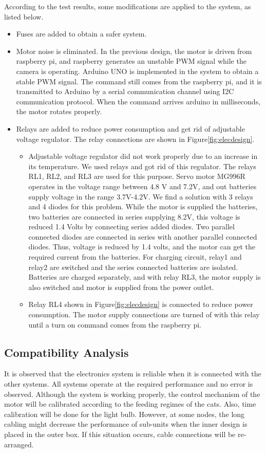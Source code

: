 According to the test results, some modifications are applied to the system, as listed below.
\begin{itemize}
\item Fuses are added to obtain a safer system. 
\item Motor noise is eliminated. In the previous design, the motor is driven from raspberry pi, and raspberry generates an unstable PWM signal while the camera is operating. Arduino UNO is implemented in the system to obtain a stable PWM signal. The command still comes from the raspberry pi, and it is transmitted to Arduino by a serial communication channel using I2C communication protocol.  When the command arrives arduino in milliseconds, the motor rotates properly. 
\item Relays are added to reduce power consumption and get rid of adjustable voltage regulator. The relay connections are shown in Figure\ref{fig:elecdesign}. 
\begin{itemize}
\item Adjustable voltage regulator did not work properly due to an increase in its temperature. We used relays and got rid of this regulator. The relays RL1, RL2, and RL3 are used for this purpose. Servo motor MG996R operates in the voltage range between 4.8 V and 7.2V, and out batteries supply voltage in the range 3.7V-4.2V.  We find a solution with 3 relays and 4 diodes for this problem.  While the motor is supplied the batteries, two batteries are connected in series supplying 8.2V, this voltage is reduced 1.4 Volts by connecting series added diodes. Two parallel connected diodes are connected in series with another parallel connected diodes. Thus, voltage is reduced by 1.4 volts, and the motor can get the required current from the batteries. For charging circuit, relay1 and relay2 are switched and the series connected batteries are isolated. Batteries are charged separately, and with relay RL3, the motor supply is also switched and motor is supplied from the power outlet.
\item Relay RL4 shown in  Figure\ref{fig:elecdesign} is connected to reduce power consumption. The motor supply connections are turned of with this relay until a turn on command comes from the raspberry pi.
\end{itemize}
\end{itemize}

\subsection{Compatibility Analysis}

It is observed that the electronics system is reliable when it is connected with the other systems. All systems operate at the required performance and no error is observed. Although the system is working properly, the control mechanism of the motor will be calibrated according to the feeding regimes of the cats. Also, time calibration will be done for the light bulb. However, at some nodes, the long cabling might decrease the performance of sub-units when the inner design is placed in the outer box. If this situation occurs, cable connections will be re-arranged.

